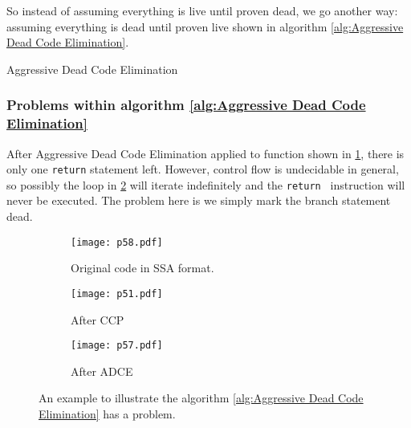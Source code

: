So instead of assuming everything is live until proven dead, we go another way: assuming everything is dead until proven live
shown in algorithm \ref{alg:Aggressive Dead Code Elimination}.



\begin{algorithm}[H]
	\caption{Aggressive Dead Code Elimination}\label{alg:Aggressive Dead Code Elimination}
	\begin{algorithmic}
		\EndIf

		\EndWhile
		\EndFunction
	\end{algorithmic}
\end{algorithm}


\subsubsection{Problems within algorithm \ref{alg:Aggressive Dead Code Elimination}}
After Aggressive Dead Code Elimination applied to function  shown in \ref{fig:p58}, there is only one \texttt{return} statement left.
However, control flow is undecidable in general, so possibly the loop in \ref{fig:pp51} will iterate indefinitely and the \texttt{return } instruction will never be executed.
The problem here is we simply mark the branch statement dead.
\begin{figure}[H]
	\centering
	\begin{subfigure}{0.5\textwidth}
		\centering
		\texttt{[image: p58.pdf]}
		\caption{Original code in SSA format. }
		\label{fig:p58}
	\end{subfigure}
	\begin{subfigure}{0.5\textwidth}
		\centering
		\texttt{[image: p51.pdf]}
		\caption{After CCP}
		\label{fig:pp51}
	\end{subfigure}
	\begin{subfigure}{0.5\textwidth}
		\centering
		\texttt{[image: p57.pdf]}
		\caption{After ADCE}
		\label{fig:p57}
	\end{subfigure}
	\caption{An example to illustrate the algorithm \ref{alg:Aggressive Dead Code Elimination} has a problem.}
	\label{fig:p51-58}
\end{figure}


